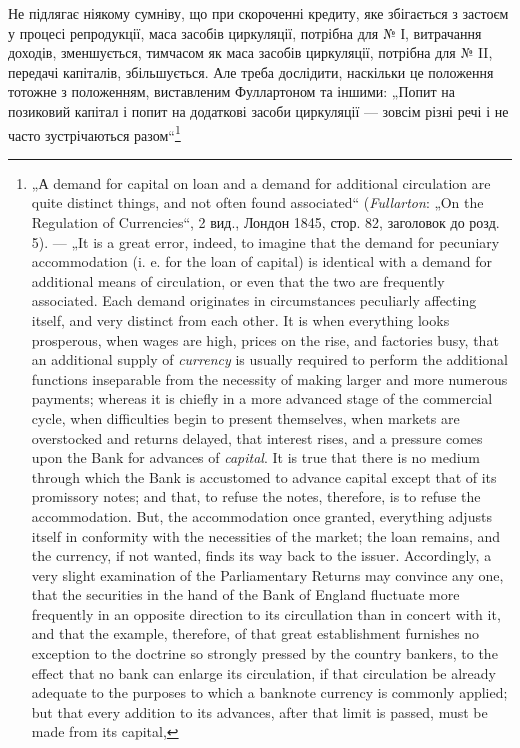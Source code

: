 Не підлягає ніякому сумніву, що при скороченні кредиту,
яке збігається з застоєм у процесі репродукції, маса засобів
циркуляції, потрібна для № І, витрачання доходів, зменшується,
тимчасом як маса засобів циркуляції, потрібна для № II, передачі капіталів, збільшується. Але треба
дослідити, наскільки
це положення тотожне з положенням, виставленим Фуллартоном
та іншими: „Попит на позиковий капітал і попит на додаткові
засоби циркуляції — зовсім різні речі і не часто зустрічаються
разом“\footnote{
„А demand for capital on loan and a demand for additional circulation are
quite distinct things, and not often found associated“ (\emph{Fullarton}: „On the Regulation of
Currencies“, 2 вид., Лондон 1845, стор. 82, заголовок до розд. 5). — „It is
a great error, indeed, to imagine that the demand for pecuniary accommodation (i. e.
for the loan of capital) is identical with a demand for additional means of circulation,
or even that the two are frequently associated. Each demand originates in circumstances peculiarly
affecting itself, and very distinct from each other. It is when everything looks prosperous, when wages are high, prices on the rise, and factories
busy, that an additional supply of \emph{currency} is usually required to perform the additional functions
inseparable from the necessity of making larger and more numerous payments; whereas it is chiefly in
a more advanced stage of the commercial
cycle, when difficulties begin to present themselves, when markets are overstocked
and returns delayed, that interest rises, and a pressure comes upon the Bank for
advances of \emph{capital}. It is true that there is no medium through which the Bank is
accustomed to advance capital except that of its promissory notes; and that, to
refuse the notes, therefore, is to refuse the accommodation. But, the accommodation
once granted, everything adjusts itself in conformity with the necessities of the
market; the loan remains, and the currency, if not wanted, finds its way back to
the issuer. Accordingly, a very slight examination of the Parliamentary Returns
may convince any one, that the securities in the hand of the Bank of England
fluctuate more frequently in an opposite direction to its circullation than in concert
with it, and that the example, therefore, of that great establishment furnishes no
exception to the doctrine so strongly pressed by the country bankers, to the effect
that no bank can enlarge its circulation, if that circulation be already adequate to
the purposes to which a banknote currency is commonly applied; but that every
addition to its advances, after that limit is passed, must be made from its capital,
}
